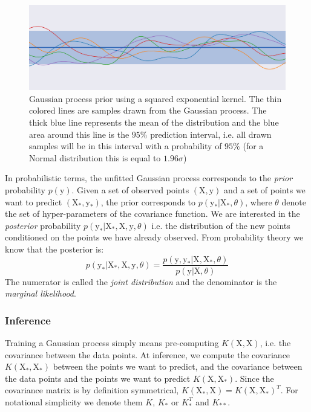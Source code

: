 \begin{figure}[htb]
	\centering
	\includegraphics[width=\linewidth]{img_hyperopt/gp_prior.png}
	\caption{Gaussian process prior using a squared exponential kernel. The thin colored lines are samples drawn from the Gaussian process. The thick blue line represents the mean of the distribution and the blue area around this line is the $95 \%$ prediction interval, i.e. all drawn samples will be in this interval with a probability of $95 \%$ (for a Normal distribution this is equal to $1.96 \sigma$)}
	\label{fig:gp_prior}
\end{figure}

In probabilistic terms, the unfitted Gaussian process corresponds to the \textit{prior} probability $p \left( \mathrm{y} \right)$. Given a set of observed points $(\mathrm{X}, \mathrm{y})$ and a set of points we want to predict $(\mathrm{X_*}, \mathrm{y_*})$, the prior corresponds to $p\left( \mathrm{y_*} | \mathrm{X_*}, \theta \right)$, where $\theta$ denote the set of hyper-parameters of the covariance function. We are interested in the \textit{posterior} probability $p\left( \mathrm{y_*} | \mathrm{X_*}, \mathrm{X}, \mathrm{y}, \theta \right)$ i.e. the distribution of the new points conditioned on the points we have already observed. From probability theory we know that the posterior is:
\begin{equation}
    p\left( \mathrm{y_*} | \mathrm{X_*}, \mathrm{X}, \mathrm{y}, \theta \right)
    =
    \frac{p\left( \mathrm{y}, \mathrm{y_*} | \mathrm{X}, \mathrm{X_*}, \theta \right)}{p\left( \mathrm{y} | \mathrm{X}, \theta \right)}
    \label{eq:posterior}
\end{equation}
The numerator is called the \textit{joint distribution} and the denominator is the \textit{marginal likelihood}. 

\subsubsection{Inference}

Training a Gaussian process simply means pre-computing $K(\mathrm{X}, \mathrm{X})$, i.e. the covariance between the data points. At inference, we compute the covariance $K(\mathrm{X_*}, \mathrm{X_*})$ between the points we want to predict, and the covariance between the data points and the points we want to predict $K(\mathrm{X}, \mathrm{X_*})$. Since the covariance matrix is by definition symmetrical, $K(\mathrm{X_*}, \mathrm{X}) = K(\mathrm{X}, \mathrm{X_*})^T$. For notational simplicity we denote them $K$, $K_*$ or $K_*^T$ and $K_{**}$.

